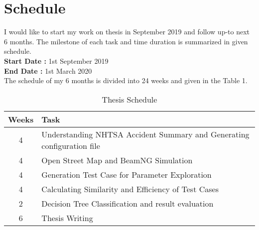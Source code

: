 \section{Schedule}

I would like to start my work on thesis in September 2019 and follow up-to next 6 months. The milestone of each task and time duration is summarized in given schedule. \\

\textbf{Start Date : }  1st September 2019 \\ 
\textbf{End Date   : }  1st March 2020 \\

The schedule of my 6 months is divided into 24 weeks and given in the Table 1.



\begin{table}[h]
\centering
\caption{Thesis Schedule} 
\medskip
\begin{tabular}{c l}
\toprule
\bfseries Weeks & \bfseries Task \\
\midrule
4 & Understanding NHTSA Accident Summary and Generating configuration file  \\
4 & Open Street Map and BeamNG Simulation \\
4 & Generation Test Case for Parameter Exploration \\
4 & Calculating Similarity and Efficiency of Test Cases \\
2 & Decision Tree Classification and result evaluation \\
6 & Thesis Writing \\
\bottomrule
\end{tabular}
\label{table:schedule}
\end{table}